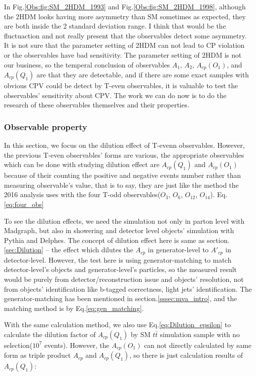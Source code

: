 			In Fig.\ref{Obs:fig:SM_2HDM_1993} and Fig.\ref{Obs:fig:SM_2HDM_1998}, although the 2HDM looks having more asymmetry than SM sometimes as expected, they are both inside the 2 standard deviation range. I think that would be the fluctuaction and not really present that the observables detect some asymmetry. It is not sure that the parameter setting of 2HDM can not lead to CP violation or the observables have bad sensitivity. The parameter setting of 2HDM is not our business, so the temperal conclusion of observables $A_1$, $A_2$, $A_{cp}(O_1)$, and $A_{cp}(Q_1)$ are that they are detectable, and if there are some exact samples with obvious CPV could be detect by T-even observables, it is valuable to test the observables' sensitivity about CPV. The work we can do now is to do the research of these observables themselves and their properties.

		\subsubsection{Observable property}
		\label{sssec:AcpObs_property}

			In this section, we focus on the dilution effect of T-evenn observables. However, the previous T-even observables' forms are various, the appropriate observables which can be done with studying dilution effect are $A_{cp}(Q_1)$ and $A_{cp}(O_1)$ because of their counting the positive and negative events number rather than measuring observable's value, that is to say, they are just like the method the 2016 analysis uses with the four T-odd observables($O_3$, $O_6$, $O_{12}$, $O_{14}$). Eq.\ref{eq:four_obs}

			To see the dilution effects, we need the simulation not only in parton level with Madgraph, but also in showering and detector level objects' simulation with Pythia and Delphes. The concept of dilution effect here is same as section.\ref{sec:Dilution} -- the effect which dilutes the $A_{cp}$ in generator-level to $A'_{cp}$ in detector-level. However, the test here is using generator-matching to match detector-level's objects and generator-level's particles, so the measured result would be purely from detector/reconstruction issue and objects' resolution, not from objects' identification like b-tagged correctness, light jets' identification. The generator-matching has been mentioned in section.\ref{sssec:mva_intro}, and the matching method is by Eq.\ref{eq:gen_matching}.

			With the same calculation method, we also use Eq.\ref{eq:Dilution_epsilon} to calculate the dilution factor of $A_{cp}(Q_1)$ by SM $t\bar{t}$ simulation sample with no selection($10^7$ events). However, the $A_{cp}(O_1)$ can not directly calculated by same form as triple product $A_{cp}$ and $A_{cp}(Q_1)$, so there is just calculation results of $A_{cp}(Q_1)$:

